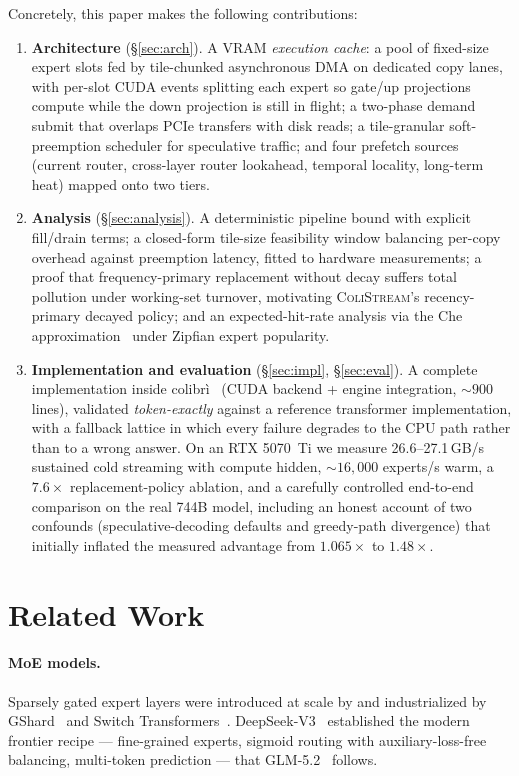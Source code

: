 \documentclass[11pt]{article}
\theoremstyle{definition}
\theoremstyle{remark}
\newcommand{\colistream}{\textsc{ColiStream}}
\begin{document}
Concretely, this paper makes the following contributions:
\begin{enumerate}
  \item \textbf{Architecture} (\S\ref{sec:arch}). A VRAM \emph{execution
  cache}: a pool of fixed-size expert slots fed by tile-chunked asynchronous
  DMA on dedicated copy lanes, with per-slot CUDA events splitting each
  expert so gate/up projections compute while the down projection is still
  in flight; a two-phase demand submit that overlaps PCIe transfers with
  disk reads; a tile-granular soft-preemption scheduler for speculative
  traffic; and four prefetch sources (current router, cross-layer router
  lookahead, temporal locality, long-term heat) mapped onto two tiers.
  \item \textbf{Analysis} (\S\ref{sec:analysis}). A deterministic pipeline
  bound with explicit fill/drain terms; a closed-form tile-size feasibility
  window balancing per-copy overhead against preemption latency, fitted to
  hardware measurements; a proof that frequency-primary replacement without
  decay suffers total pollution under working-set turnover, motivating
  \colistream's recency-primary decayed policy; and an expected-hit-rate
  analysis via the Che approximation~\citep{che2002hierarchical} under
  Zipfian expert popularity.
  \item \textbf{Implementation and evaluation} (\S\ref{sec:impl},
  \S\ref{sec:eval}). A complete implementation inside
  colibr\`i~\citep{colibri2026} (CUDA backend + engine integration,
  ${\sim}900$ lines), validated \emph{token-exactly} against a reference
  transformer implementation, with a fallback lattice in which every failure
  degrades to the CPU path rather than to a wrong answer. On an RTX 5070~Ti
  we measure 26.6--27.1\,GB/s sustained cold streaming with compute hidden,
  ${\sim}16{,}000$ experts/s warm, a $7.6\times$ replacement-policy ablation,
  and a carefully controlled end-to-end comparison on the real 744B model,
  including an honest account of two confounds (speculative-decoding
  defaults and greedy-path divergence) that initially inflated the measured
  advantage from $1.065\times$ to $1.48\times$.
\end{enumerate}

\section{Related Work}\label{sec:related}

\paragraph{MoE models.} Sparsely gated expert layers were introduced at scale
by \citet{shazeer2017outrageously} and industrialized by
GShard~\citep{lepikhin2020gshard} and Switch
Transformers~\citep{fedus2022switch}. DeepSeek-V3~\citep{deepseek2024v3}
established the modern frontier recipe --- fine-grained experts, sigmoid
routing with auxiliary-loss-free balancing, multi-token
prediction --- that GLM-5.2~\citep{glm52report} follows.
\end{document}
